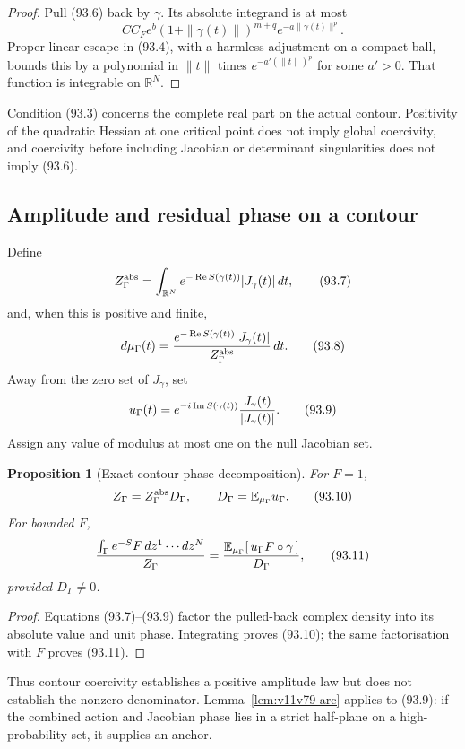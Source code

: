 \documentclass[11pt]{article}
\newtheorem{proposition}[theorem]{Proposition}
\begin{document}
\begin{proof}
Pull (93.6) back by \(\gamma\).  Its absolute integrand is at most
\[
 C C_F e^b(1+\|\gamma(t)\|)^{m+q}
                  e^{-a\|\gamma(t)\|^p}.
\]
Proper linear escape in (93.4), with a harmless adjustment on a
compact ball, bounds this by a polynomial in \(\|t\|\) times
\(e^{-a'( \|t\|)^p}\) for some \(a'>0\).  That function is integrable
on \(\mathbb R^N\).
\end{proof}

Condition (93.3) concerns the complete real part on the actual
contour.  Positivity of the quadratic Hessian at one critical point
does not imply global coercivity, and coercivity before including
Jacobian or determinant singularities does not imply (93.6).

\subsection{Amplitude and residual phase on a contour}

Define
\[
 Z_\Gamma^{\rm abs}
 =\int_{\mathbb R^N}
       e^{-\operatorname{Re}S(\gamma(t))}
       |J_\gamma(t)|\,dt,                                   \tag{93.7}
\]
and, when this is positive and finite,
\[
 d\mu_\Gamma(t)
 ={e^{-\operatorname{Re}S(\gamma(t))}
       |J_\gamma(t)|\over Z_\Gamma^{\rm abs}}\,dt.           \tag{93.8}
\]
Away from the zero set of \(J_\gamma\), set
\[
 u_\Gamma(t)
 =e^{-i\operatorname{Im}S(\gamma(t))}
       {J_\gamma(t)\over|J_\gamma(t)|}.                      \tag{93.9}
\]
Assign any value of modulus at most one on the null Jacobian set.

\begin{proposition}[Exact contour phase decomposition]
\label{prop:v11v93-decomposition}
For \(F=1\),
\[
 Z_\Gamma=Z_\Gamma^{\rm abs}D_\Gamma,\qquad
 D_\Gamma=\mathbb E_{\mu_\Gamma}u_\Gamma.                   \tag{93.10}
\]
For bounded \(F\),
\[
 {\int_\Gamma e^{-S}F\,dz^1\cdots dz^N\over Z_\Gamma}
 ={ \mathbb E_{\mu_\Gamma}
       [\,u_\Gamma F\circ\gamma\,]\over D_\Gamma},           \tag{93.11}
\]
provided \(D_\Gamma\ne0\).
\end{proposition}

\begin{proof}
Equations (93.7)--(93.9) factor the pulled-back complex density into
its absolute value and unit phase.  Integrating proves (93.10);
the same factorisation with \(F\) proves (93.11).
\end{proof}

Thus contour coercivity establishes a positive amplitude law but does
not establish the nonzero denominator.  Lemma~\ref{lem:v11v79-arc}
applies to (93.9): if the combined action and Jacobian phase lies in a
strict half-plane on a high-probability set, it supplies an anchor.
\end{document}
